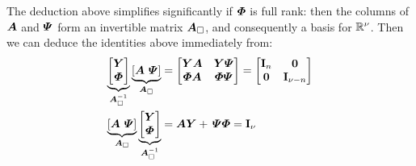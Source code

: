 The deduction above simplifies significantly if $\boldsymbol{\varPhi}$ is full rank: then the columns of $\boldsymbol{A}$ and $\boldsymbol{\varPsi}$ form an invertible matrix $\boldsymbol{A}_\square$, and consequently a basis for $\mathbb{R}^\nu$.
Then we can deduce the identities above immediately from:
\begin{subequations}
\begin{align}
 \underbrace{\begin{bmatrix} \kinBasisMat \\ \geoConstraintMat \end{bmatrix}}_{\kinMatSquare^{-1}} \underbrace{[\kinMat \ \InvGeoConstraintMat]}_{\kinMatSquare}
 &= \begin{bmatrix} \kinBasisMat \kinMat & \kinBasisMat\InvGeoConstraintMat\\ \geoConstraintMat\kinMat & \geoConstraintMat \InvGeoConstraintMat \end{bmatrix} 
 = \begin{bmatrix} \idMat[\dimConfigSpace] & \mat{0} \\ \mat{0} & \idMat[\numCoord-\dimConfigSpace] \end{bmatrix} 
\\
 \underbrace{[\kinMat \ \InvGeoConstraintMat]}_{\kinMatSquare}
 \underbrace{\begin{bmatrix} \kinBasisMat \\ \geoConstraintMat \end{bmatrix}}_{\kinMatSquare^{-1}}
 &= \kinMat \kinBasisMat +\, \InvGeoConstraintMat \geoConstraintMat
 = \idMat[\numCoord]
\end{align}
\end{subequations}

